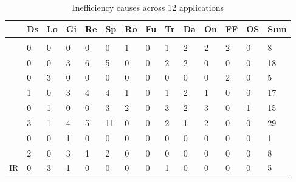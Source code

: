 \begin{table}[]
\centering
\small
\caption{Inefficiency causes across 12 applications}
\label{tab:freq}
\begin{tabular}{@{\hspace{0.1in}}c@{\hspace{0.1in}}g@{\hspace{0.1in}}g@{\hspace{0.1in}}g@{\hspace{0.1in}}g@{\hspace{0.1in}}g@{\hspace{0.1in}}g@{\hspace{0.1in}}g@{\hspace{0.1in}}g@{\hspace{0.1in}}g@{\hspace{0.1in}}g@{\hspace{0.1in}}g@{\hspace{0.1in}}g@{\hspace{0.1in}}g@{\hspace{0.1in}}}
\toprule

   &Ds & Lo & Gi & Re & Sp & Ro & Fu & Tr & Da & On & FF & OS& Sum  \\
 \midrule
{}
\\
\midrule
{}
  & { 0} & {0} & 0 & 0 & 0 & 1 & 0 & 1 & 2 & 2 & 2 & 0 & 8 \\

  & 0 & 0 & 3 & 6 & 5 & 0 & 0 & 2 & 2 & 0 & 0 & 0 & 18 \\ 

   & 0 & 3 & 0 & 0 & 0 & 0 & 0 & 0 & 0 & 0 & 2 & 0 & 5 \\
  & 1 & 0 & 3 & 4 & 4 & 1 & 0 & 1 & 2 & 1 & 0 & 0 & 17 \\

    & 0 & 1 & 0 & 0 & 3 & 2 & 0 & 3 & 2 & 3 & 0 & 1 & 15 \\
   & 3 & 1 & 4 & 5 & 11 & 0 & 0 & 2 & 1 & 2 & 0 & 0 & 29 \\
    & 0 & 0 & 1 & 0 & 0 & 0 & 0 & 0 & 0 & 0 & 0 & 0 & 1 \\
    & 2 & 0 & 3 & 1 & 2 & 0 & 0 & 0 & 0 & 0 & 0 & 0 & 8 \\
   IR & 0 & 3 & 1 & 0 & 0 & 0 & 0 & 1 & 0 & 0 & 0 & 0 & 5 \\
\midrule


\end{tabular}
\end{table}
